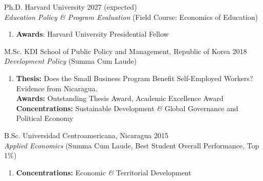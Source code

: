 \documentclass[a4paper, 10pt]{article}
\renewenvironment{itemize}{
  \begin{list}{}
    { \setlength{\itemsep}{5pt}
      \setlength{\parsep}{0pt}
      \setlength{\topsep}{0pt}
      \setlength{\leftmargin}{0em} } }{
  \end{list}}
\begin{document}
\begin{itemize}
\item Ph.D. Harvard University \hfill 2027 (expected) \\
{\small \textit{Education Policy \& Program Evaluation} (Field Course: Economics
of Education)}
  \begin{enumerate}[leftmargin=10pt, label={}, nosep]
    \item {\small \textbf{Awards}: Harvard University Presidential Fellow }
  \end{enumerate}

\item M.Sc. KDI School of Public Policy and Management, Republic of Korea \hfill 2018 \\
{\small \textit{Development Policy} (Summa Cum Laude)}
  
  \begin{enumerate}[leftmargin=10pt, label={}, nosep]
    \item {\small \textbf{Thesis:} Does the Small Business Program Benefit Self-Employed Workers? Evidence from Nicaragua. \\ 
    \textbf{Awards:} Outstanding Thesis Award, Academic Excellence Award \\ 
    \textbf{Concentrations:} Sustainable Development \textit{\&} Global Governance and Political Economy }
  \end{enumerate}
\item B.Sc. Universidad Centroamericana, Nicaragua \hfill 2015 \\
{\small \textit{Applied Economics} (Summa Cum Laude, Best Student Overall Performance, Top 1\%)}
  
  \begin{enumerate}[leftmargin=10pt, label={}, nosep]
    \item {\small \textbf{Concentrations:} Economic \textit{\&} Territorial Development}
  \end{enumerate}
\end{itemize}
\end{document}
